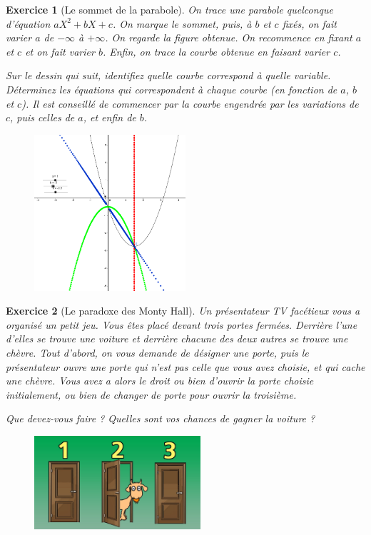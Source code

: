 \documentclass[12pt]{article}
\theoremstyle{break}
\newtheorem{exo}{Exercice}
\begin{document}
\begin{exo}[Le sommet de la parabole]
On trace une parabole quelconque d'équation $aX^2+bX+c$. On marque le sommet, puis, à $b$ et $c$ fixés, on fait varier $a$ de $-\infty$ à $+\infty$. On regarde la figure obtenue. On recommence en fixant $a$ et $c$ et on fait varier $b$. Enfin, on trace la courbe obtenue en faisant varier $c$.

Sur le dessin qui suit, identifiez quelle courbe correspond à quelle variable. Déterminez les équations qui correspondent à chaque courbe (en fonction de $a$, $b$ et $c$). Il est conseillé de commencer par la courbe engendrée par les variations de $c$, puis celles de $a$, et enfin de $b$.

\begin{figure}[h!]
	\centering
    \includegraphics[width=0.5\textwidth]{images/SommetParabole.png}

\end{figure}
\end{exo}


\begin{exo}[Le paradoxe des Monty Hall]
Un présentateur TV facétieux vous a organisé un petit jeu. Vous êtes placé devant trois portes fermées. Derrière l'une d'elles se trouve une voiture et derrière chacune des deux autres se trouve une chèvre. Tout d'abord, on vous demande de désigner une porte, puis le présentateur ouvre une porte qui n'est pas celle que vous avez choisie, et qui cache une chèvre. Vous avez a alors le droit ou bien d'ouvrir la porte choisie initialement, ou bien de changer de porte pour ouvrir la troisième.

Que devez-vous faire ? Quelles sont vos chances de gagner la voiture ?

\begin{figure}[!ht]
	\centering
    \includegraphics[width=0.55\textwidth]{images/MontyHall.jpg}

\end{figure}
\end{exo}
\end{document}
